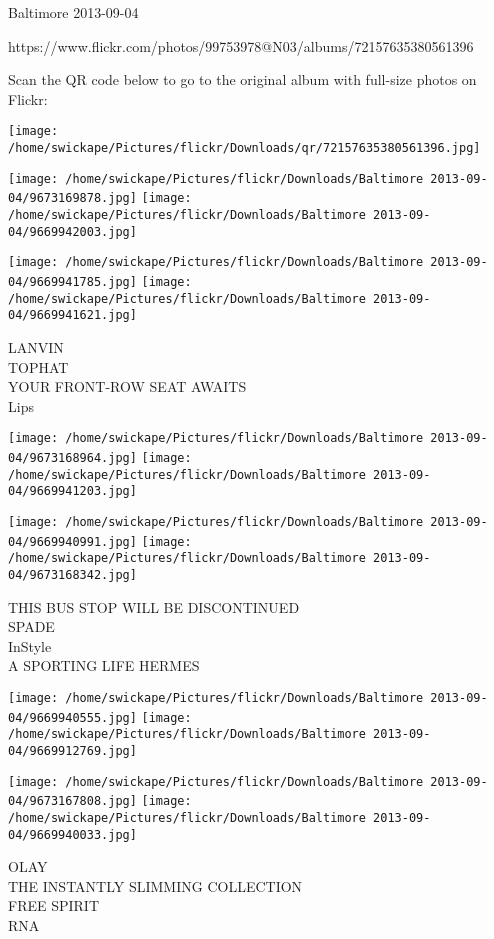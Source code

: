 \documentclass[10pt,letterpaper]{article}
\begin{document}
Baltimore 2013-09-04

https://www.flickr.com/photos/99753978@N03/albums/72157635380561396

Scan the QR code below to go to the original album with full-size photos on Flickr:

\texttt{[image: /home/swickape/Pictures/flickr/Downloads/qr/72157635380561396.jpg]}
\pagebreak

\texttt{[image: /home/swickape/Pictures/flickr/Downloads/Baltimore 2013-09-04/9673169878.jpg]}
\texttt{[image: /home/swickape/Pictures/flickr/Downloads/Baltimore 2013-09-04/9669942003.jpg]}

\texttt{[image: /home/swickape/Pictures/flickr/Downloads/Baltimore 2013-09-04/9669941785.jpg]}
\texttt{[image: /home/swickape/Pictures/flickr/Downloads/Baltimore 2013-09-04/9669941621.jpg]}

LANVIN\\
TOPHAT\\
YOUR FRONT{-}ROW SEAT AWAITS\\
Lips
\pagebreak

\texttt{[image: /home/swickape/Pictures/flickr/Downloads/Baltimore 2013-09-04/9673168964.jpg]}
\texttt{[image: /home/swickape/Pictures/flickr/Downloads/Baltimore 2013-09-04/9669941203.jpg]}

\texttt{[image: /home/swickape/Pictures/flickr/Downloads/Baltimore 2013-09-04/9669940991.jpg]}
\texttt{[image: /home/swickape/Pictures/flickr/Downloads/Baltimore 2013-09-04/9673168342.jpg]}

THIS BUS STOP WILL BE DISCONTINUED\\
SPADE\\
InStyle\\
A SPORTING LIFE HERMES
\pagebreak

\texttt{[image: /home/swickape/Pictures/flickr/Downloads/Baltimore 2013-09-04/9669940555.jpg]}
\texttt{[image: /home/swickape/Pictures/flickr/Downloads/Baltimore 2013-09-04/9669912769.jpg]}

\texttt{[image: /home/swickape/Pictures/flickr/Downloads/Baltimore 2013-09-04/9673167808.jpg]}
\texttt{[image: /home/swickape/Pictures/flickr/Downloads/Baltimore 2013-09-04/9669940033.jpg]}

OLAY\\
THE INSTANTLY SLIMMING COLLECTION\\
FREE SPIRIT\\
RNA
\pagebreak
\end{document}

